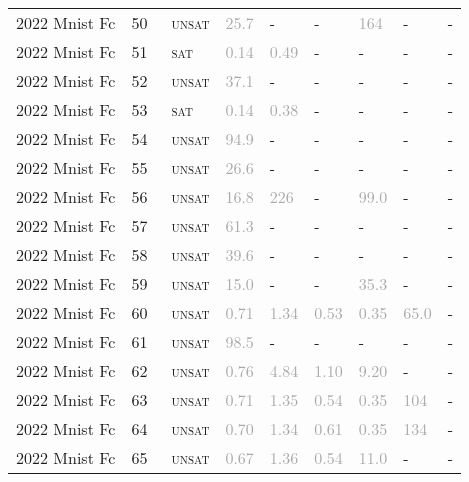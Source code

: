 \begin{center}
{\begin{longtable}{@{}lllllllll@{}}
2022 Mnist Fc & 50 & ~\textsc{unsat} & \textcolor{darkgray}{25.7} & - & - & \textcolor{darkgray}{164} & - & - \\
2022 Mnist Fc & 51 & ~\textsc{sat} & \textcolor{darkgray}{0.14} & \textcolor{darkgray}{0.49} & - & - & - & - \\
2022 Mnist Fc & 52 & ~\textsc{unsat} & \textcolor{darkgray}{37.1} & - & - & - & - & - \\
2022 Mnist Fc & 53 & ~\textsc{sat} & \textcolor{darkgray}{0.14} & \textcolor{darkgray}{0.38} & - & - & - & - \\
2022 Mnist Fc & 54 & ~\textsc{unsat} & \textcolor{darkgray}{94.9} & - & - & - & - & - \\
2022 Mnist Fc & 55 & ~\textsc{unsat} & \textcolor{darkgray}{26.6} & - & - & - & - & - \\
2022 Mnist Fc & 56 & ~\textsc{unsat} & \textcolor{darkgray}{16.8} & \textcolor{darkgray}{226} & - & \textcolor{darkgray}{99.0} & - & - \\
2022 Mnist Fc & 57 & ~\textsc{unsat} & \textcolor{darkgray}{61.3} & - & - & - & - & - \\
2022 Mnist Fc & 58 & ~\textsc{unsat} & \textcolor{darkgray}{39.6} & - & - & - & - & - \\
2022 Mnist Fc & 59 & ~\textsc{unsat} & \textcolor{darkgray}{15.0} & - & - & \textcolor{darkgray}{35.3} & - & - \\
2022 Mnist Fc & 60 & ~\textsc{unsat} & \textcolor{darkgray}{0.71} & \textcolor{darkgray}{1.34} & \textcolor{darkgray}{0.53} & \textcolor{darkgray}{0.35} & \textcolor{darkgray}{65.0} & - \\
2022 Mnist Fc & 61 & ~\textsc{unsat} & \textcolor{darkgray}{98.5} & - & - & - & - & - \\
2022 Mnist Fc & 62 & ~\textsc{unsat} & \textcolor{darkgray}{0.76} & \textcolor{darkgray}{4.84} & \textcolor{darkgray}{1.10} & \textcolor{darkgray}{9.20} & - & - \\
2022 Mnist Fc & 63 & ~\textsc{unsat} & \textcolor{darkgray}{0.71} & \textcolor{darkgray}{1.35} & \textcolor{darkgray}{0.54} & \textcolor{darkgray}{0.35} & \textcolor{darkgray}{104} & - \\
2022 Mnist Fc & 64 & ~\textsc{unsat} & \textcolor{darkgray}{0.70} & \textcolor{darkgray}{1.34} & \textcolor{darkgray}{0.61} & \textcolor{darkgray}{0.35} & \textcolor{darkgray}{134} & - \\
2022 Mnist Fc & 65 & ~\textsc{unsat} & \textcolor{darkgray}{0.67} & \textcolor{darkgray}{1.36} & \textcolor{darkgray}{0.54} & \textcolor{darkgray}{11.0} & - & - \\

\end{longtable}}
\end{center}

